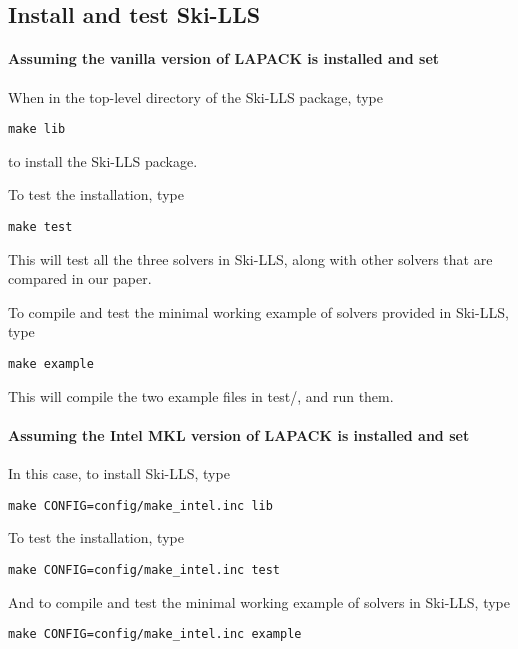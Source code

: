 \documentclass[english,11pt]{article}
\begin{document}
\subsection{Install and test Ski-LLS}

\paragraph{Assuming the vanilla version of LAPACK is installed and set}
When in the top-level directory of the Ski-LLS package, type
\begin{lstlisting}[breaklines=true, showstringspaces=false]
make lib
\end{lstlisting}
to install the Ski-LLS package. 

To test the installation, type
\begin{lstlisting}[breaklines=true, showstringspaces=false]
make test
\end{lstlisting}
This will test all the three solvers in Ski-LLS, along with other solvers that are compared in our paper. 

To compile and test the minimal working example of solvers provided in Ski-LLS, type
\begin{lstlisting}[breaklines=true, showstringspaces=false]
make example
\end{lstlisting}
This will compile the two example files in test/, and run them.

\paragraph{Assuming the Intel MKL version of LAPACK is installed and set}
In this case, to install Ski-LLS, type
\begin{lstlisting}[breaklines=true, showstringspaces=false]
make CONFIG=config/make_intel.inc lib
\end{lstlisting}
To test the installation, type
\begin{lstlisting}[breaklines=true, showstringspaces=false]
make CONFIG=config/make_intel.inc test
\end{lstlisting}
And to compile and test the minimal working example of solvers in Ski-LLS, type
\begin{lstlisting}[breaklines=true, showstringspaces=false]
make CONFIG=config/make_intel.inc example
\end{lstlisting}
\end{document}
